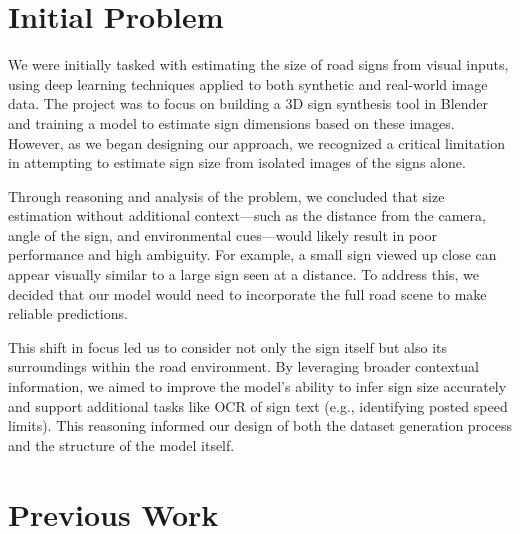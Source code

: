 \documentclass[journal]{IEEEtran}
\begin{document}
\section{Initial Problem}
We were initially tasked with estimating the size of road signs from visual inputs, using deep learning techniques applied to both synthetic and real-world image data. The project was to focus on building a 3D sign synthesis tool in Blender and training a model to estimate sign dimensions based on these images. However, as we began designing our approach, we recognized a critical limitation in attempting to estimate sign size from isolated images of the signs alone.

Through reasoning and analysis of the problem, we concluded that size estimation without additional context—such as the distance from the camera, angle of the sign, and environmental cues—would likely result in poor performance and high ambiguity. For example, a small sign viewed up close can appear visually similar to a large sign seen at a distance. To address this, we decided that our model would need to incorporate the full road scene to make reliable predictions.

This shift in focus led us to consider not only the sign itself but also its surroundings within the road environment. By leveraging broader contextual information, we aimed to improve the model’s ability to infer sign size accurately and support additional tasks like OCR of sign text (e.g., identifying posted speed limits). This reasoning informed our design of both the dataset generation process and the structure of the model itself.


\section{Previous Work}
\end{document}
